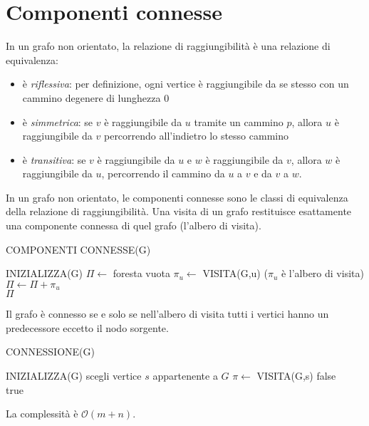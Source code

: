 \documentclass[11pt]{book}
\begin{document}
\section{Componenti connesse}
In un grafo non orientato, la relazione di raggiungibilità è una relazione di equivalenza:
\begin{itemize}
    \item è \textit{riflessiva}: per definizione, ogni vertice è raggiungibile da se stesso con un cammino degenere di 
    lunghezza 0
    \item è \textit{simmetrica}: se $v$ è raggiungibile da $u$ tramite un cammino $p$, allora $u$ è raggiungibile da $v$ 
    percorrendo all'indietro lo stesso cammino
    \item è \textit{transitiva}: se $v$ è raggiungibile da $u$ e $w$ è raggiungibile da $v$, allora $w$ è raggiungibile 
    da $u$, percorrendo il cammino da $u$ a $v$ e da $v$ a $w$.
\end{itemize}
In un grafo non orientato, le componenti connesse sono le classi di equivalenza della relazione di raggiungibilità. Una 
visita di un grafo restituisce esattamente una componente connessa di quel grafo (l'albero di visita).
\begin{algorithm}[H]
    \caption{COMPONENTI CONNESSE(G)}
    \begin{algorithmic}
        \State INIZIALIZZA(G)
        \State $\Pi \gets$ foresta vuota 
                \State $\pi_u \gets$ VISITA(G,u) ($\pi_u$ è l'albero di visita)
                \State $\Pi \gets \Pi+{\pi_u}$
            \EndIf 
        \EndFor\\
        \Return $\Pi$
    \end{algorithmic}
\end{algorithm}
Il grafo è connesso se e solo se nell'albero di visita tutti i vertici hanno un predecessore eccetto il nodo sorgente.
\begin{algorithm}
    \caption{CONNESSIONE(G)}
    \begin{algorithmic}
        \State INIZIALIZZA(G)
        \State scegli vertice $s$ appartenente a $G$
        \State $\pi \gets$ VISITA(G,s)
            \Return false 
            \EndIf
        \EndFor\\ 
        \Return true
    \end{algorithmic}
\end{algorithm}
La complessità è $\mathcal{O}(m+n)$.
\end{document}
